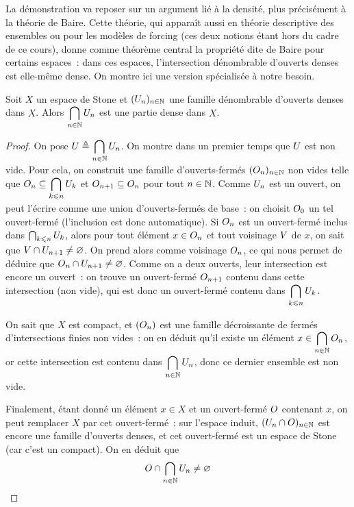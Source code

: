 La démonstration va reposer sur un argument lié à la densité, plus précisément
à la théorie de Baire. Cette théorie, qui apparaît aussi en théorie descriptive
des ensembles ou pour les modèles de forcing (ces deux notions étant hors du
cadre de ce cours), donne comme théorème central la propriété dite de Baire pour
certains espaces~: dans ces espaces, l'intersection dénombrable d'ouverts denses
est elle-même dense. On montre ici une version spécialisée à notre besoin.

\begin{theorem}\label{thm.baire}
  Soit $X$ un espace de Stone et $(U_n)_{n \in \mathbb N}$ une famille dénombrable
  d'ouverts denses dans $X$. Alors $\displaystyle\bigcap_{n \in \mathbb N}U_n$ est
  une partie dense dans $X$.
\end{theorem}

\begin{proof}
  On pose $\displaystyle U\triangleq\bigcap_{n \in \mathbb N}U_n$.
  On montre dans un premier temps que $U$ est non vide. Pour cela, on
  construit une famille d'ouverts-fermés $(O_n)_{n \in \mathbb N}$ non vides telle
  que $\displaystyle O_n\subseteq\bigcap_{k \leqslant n} U_k$ et
  $O_{n+1}\subseteq O_{n}$ pour tout $n\in\mathbb N$. Comme $U_n$ est
  un ouvert, on peut l'écrire comme une union d'ouverts-fermés de base~: on
  choisit $O_0$ un tel ouvert-fermé (l'inclusion est donc automatique).
  Si $O_n$ est un ouvert-fermé inclus dans $\bigcap_{k \leqslant n}U_k$,
  alors pour tout élément $x \in O_n$ et tout voisinage $V$ de
  $x$, on sait que $V\cap U_{n+1}\neq\varnothing$. On prend alors comme
  voisinage $O_n$, ce qui nous permet de déduire que
  $O_n\cap U_{n+1}\neq\varnothing$. Comme on a deux ouverts, leur
  intersection est encore un ouvert~: on trouve un ouvert-fermé
  $O_{n+1}$ contenu dans cette intersection (non vide), qui est donc
  un ouvert-fermé contenu dans $\displaystyle\bigcap_{k \leqslant n} U_{k}$.

  On sait que $X$ est compact, et $(O_n)$ est une famille décroissante
  de fermés d'intersections finies non vides~: on en déduit qu'il existe un
  élément $x \in \displaystyle\bigcap_{n \in \mathbb N}O_n$, or cette
  intersection est contenu dans
  $\displaystyle\bigcap_{n \in \mathbb N}U_n$, donc ce dernier ensemble est
  non vide.

  Finalement, étant donné un élément $x \in X$ et un ouvert-fermé $O$
  contenant $x$, on peut remplacer $X$ par cet ouvert-fermé~: sur l'espace
  induit, $(U_n\cap O)_{n\in\mathbb N}$ est encore une famille d'ouverts
  denses, et cet ouvert-fermé est un espace de Stone (car c'est un compact). On
  en déduit que
  \[O\cap\bigcap_{n\in\mathbb N}U_n \neq \varnothing\qedhere\]
\end{proof}

